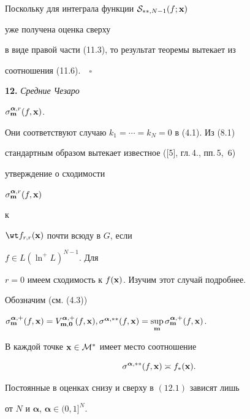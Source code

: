 Поскольку для интеграла функции ${\cal S}_{**,N-1}(f;{\bold x})$


уже получена оценка сверху


в виде правой части (11.3), то результат теоремы вытекает из 


соотношения (11.6).$\quad\square$


\medskip





\addtocounter{section}{1}


\setcounter{equation}{0}


\setcounter{lems}{0}


\setcounter{thms}{0}





{\bf 12.} {\it Средние Чезаро}


$\sigma_{{\bold m}}^{{\boldsymbol {\alpha}},r}(f,{\bold x})$.


Они соответствуют случаю $k_1=\dotsb=k_N=0$ в (4.1). Из (8.1)


стандартным образом вытекает известное ([5], гл.\,4., пп.\,5,~6)


утверждение о сходимости


$\sigma_{{\bold m}}^{{\boldsymbol {\alpha}},r}(f,{\bold x})$


к


$\wt f_{r,r}({\bold x})$ почти всюду в $G$, если


$f\in L(\ln^+L)^{N-1}$. Для


$r=0$ имеем сходимость к $f({\bold x})$. Изучим этот случай подробнее.


Обозначим (см. (4.3))


$\sigma_{{\bold m}}^{{\boldsymbol {\alpha}},+}(f,{\bold x}) =


V_{{\bold m},{\bold 0}}^{{\boldsymbol {\alpha}},+}(f,{\bold x}), 


\sigma^{{\boldsymbol {\alpha}},**}(f,{\bold x})


=\sup\limits_{{\bold m}}\sigma_{{\bold m}}^{{\boldsymbol {\alpha}},+}(f,{\bold x})$.








\begin{thms}


В каждой точке ${\bold x}\in {\cal M}^*$ имеет место соотношение


\begin{equation}


\sigma^{{\boldsymbol {\alpha}},**}(f,{\bold x}) \asymp f_*({\bold x}).


\end{equation}


Постоянные в оценках снизу и сверху в $(12.1)$ зависят лишь


от $N$ и ${\boldsymbol {\alpha}}$, ${\boldsymbol {\alpha}}\in (0,1]^N$.


\end{thms}





